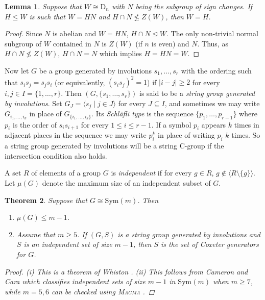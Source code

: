 \documentclass{amsart}
\numberwithin{equation}{section}
\theoremstyle{plain} %
\newtheorem{theorem}{Theorem}[section]
\newtheorem{lemma}[theorem]{Lemma}
\begin{document}
\begin{lemma}\label{intN} Suppose that $W \cong \mathrm{D}_n$ with $N$ being the subgroup of sign changes. If $H \leq W$ is such that $W = HN$ and $H \cap N \not\leq Z(W)$, then $W = H$.
\end{lemma}

\begin{proof} Since $N$ is abelian and $W = HN$,  $H \cap N \unlhd W$.  The only non-trivial normal subgroup of $W$ contained in $N$ is $Z(W)$ (if $n$ is even) and $N$. Thus, as $H \cap N \not\leq Z(W)$, $H \cap N = N$ which implies $H = HN = W$.
\end{proof}


Now let $G$ be a group generated by involutions $s_1, \dots, s_r$ with the ordering such that $s_i s_j = s_j s_i$ (or equivalently, $(s_i s_j)^2 = 1$) if $|i-j| \ge 2$ for every $i,j \in I = \{1, \dots, r \}$. Then $(G,\{ s_1, \dots, s_r \})$ is said to be a \emph{string group generated by involutions}.  Set $G_J = \langle s_j \; | \; j \in J \rangle$ for every $J \subseteq I$, and sometimes we may write $G_{i_1,\dots,i_k}$ in place of $G_{\{i_1,\dots,i_k\}}$.  Its \emph{Schl\"{a}fli type} is the sequence $\{p_1,\dots,p_{r-1}\}$ where $p_i$ is the order of $s_is_{i+1}$ for every $1 \leq i \leq r-1$. If a symbol $p_i$ appears $k$ times in adjacent places in the sequence we may write $p_i^k$ in place of writing $p_i$ $k$ times. So a string group generated by involutions will be a string C-group if the intersection condition also holds.

A  set $R$ of elements of a group $G$ is \emph{independent} if for every $g \in R$, $g \not\in \langle R \setminus \{ g \} \rangle$. Let $\mu(G)$ denote the maximum size of an independent subset of $G$.

\begin{theorem}\label{independ} Suppose that $G \cong \mathrm{Sym}(m)$. Then
\begin{enumerate}
\item [(i)] $\mu(G) \leq m-1$.
\item [(ii)] Assume that $m \geq 5$.  If $(G,S)$ is a string group generated by involutions and $S$ is an independent set of size $m-1$, then $S$ is the set of Coxeter generators for $G$.
\end{enumerate}

\begin{proof}(i) This is a theorem of Whiston \cite{whiston}.
(ii) This follows from Cameron and Cara \cite{p7} which classifies independent sets of size $m - 1$ in $\mathrm{Sym}(m)$ when $m \geq 7$, while $m = 5, 6$ can be checked using \textsc{Magma} \cite{magma}.
\end{proof}

\end{theorem}
\end{document}
